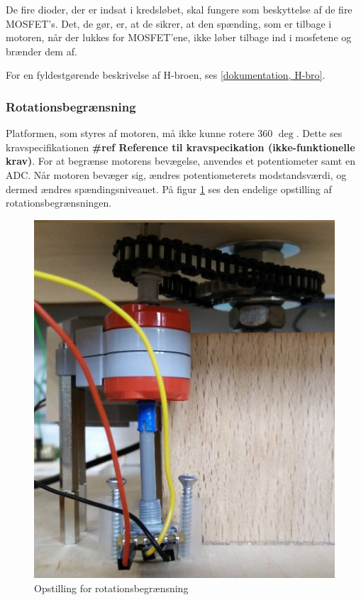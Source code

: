 De fire dioder, der er indsat i kredsløbet, skal fungere som beskyttelse af de fire MOSFET's. Det, de gør, er, at de sikrer, at den spænding, som er tilbage i motoren, når der lukkes for MOSFET'ene, ikke løber tilbage ind i mosfetene og brænder dem af.

For en fyldestgørende beskrivelse af H-broen, ses \ref{dokumentation, H-bro}. 

\subsubsection{Rotationsbegrænsning}
Platformen, som styres af motoren, må ikke kunne rotere 360 \(\deg\). Dette ses kravspecifikationen \textbf{\#ref Reference til kravspecikation (ikke-funktionelle krav)}. For at begrænse motorens bevægelse, anvendes et potentiometer samt en ADC. Når motoren bevæger sig, ændres potentiometerets modstandsværdi, og dermed ændres spændingsniveauet. På figur \ref{fig:opstillingADC} ses den endelige opstilling af rotationsbegrænsningen.

\begin{figure}[H]
	\centering
	\includegraphics[scale=0.3]{Afsnit/DesignOgImplementering/images/potentiometerADC}
	\caption{Opstilling for rotationsbegrænsning}
	\label{fig:opstillingADC}
\end{figure}

